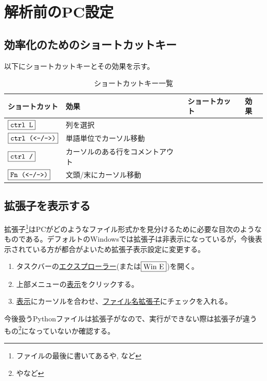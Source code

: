\documentclass[dvipdfmx, leqno]{jsreport}
\begin{document}
\appendix
\chapter{解析前のPC設定}

\section{効率化のためのショートカットキー}\label{sec:shortcutkey}
    以下にショートカットキーとその効果を示す。

\begin{table}[h]
\begin{center}
\caption{ショートカットキー一覧}
\begin{tabular}{ll|ll}
    ショートカット& 効果& ショートカット& 効果\\ \hline\hline
    $\fbox{\texttt{ctrl L}}$& 列を選択&&\\
    $\fbox{\texttt{ctrl (<-/->)}}$& 単語単位でカーソル移動&&\\
    $\fbox{\texttt{ctrl /}}$& カーソルのある行をコメントアウト&&\\
    $\fbox{\texttt{Fn (<-/->)}}$& 文頭/末にカーソル移動&&
\end{tabular}
\end{center}
\end{table}

\section{拡張子を表示する}\label{sec:拡張子を表示する}
    拡張子\footnote{ファイルの最後に書いてあるや, など}はPCがどのようなファイル形式かを見分けるために必要な目次のようなものである。デフォルトのWindowsでは拡張子は非表示になっているが，今後表示されている方が都合がよいため拡張子表示設定に変更する。
\begin{enumerate}
    \item タスクバーの\underline{エクスプローラー}(または$\fbox{Win E}$)を開く。
    \item 上部メニューの\underline{表示}をクリックする。
    \item \underline{表示}にカーソルを合わせ、\underline{ファイル名拡張子}にチェックを入れる。
\end{enumerate}
    今後扱うPythonファイルは拡張子がなので、実行ができない際は拡張子が違うもの\footnote{やなど}になっていないか確認する。
\end{document}
